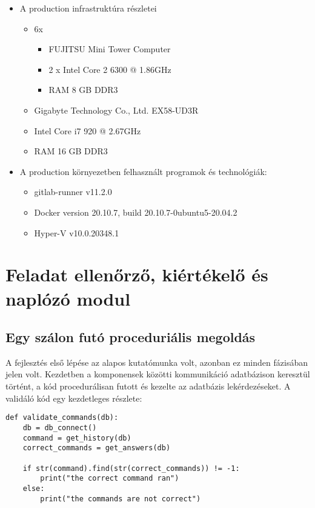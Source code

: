 \documentclass[12pt]{report}
\begin{document}
\begin{itemize}
    \item A production infrastruktúra részletei
    \begin{itemize}
        \item 6x
        \begin{itemize}
            \item FUJITSU Mini Tower Computer
            \item 2 x Intel Core 2 6300 @ 1.86GHz
            \item RAM 8 GB DDR3
        \end{itemize}
        \item Gigabyte Technology Co., Ltd. EX58-UD3R
        \item Intel Core i7 920 @ 2.67GHz
        \item RAM 16 GB DDR3
    \end{itemize}
    \item A production környezetben felhasznált programok és technológiák:
    \begin{itemize}
        \item gitlab-runner v11.2.0
        \item Docker version 20.10.7, build 20.10.7-0ubuntu5-20.04.2
        \item Hyper-V v10.0.20348.1
    \end{itemize}
\end{itemize}


\chapter{Feladat ellenőrző, kiértékelő és naplózó modul}
\section{Egy szálon futó proceduriális megoldás}


A fejlesztés első lépése az alapos kutatómunka volt, azonban ez minden fázisában jelen volt. Kezdetben a komponensek közötti kommunikáció adatbázison keresztül történt, a kód procedurálisan futott és kezelte az adatbázis lekérdezéseket. A validáló kód egy kezdetleges részlete:

\begin{verbatim}
def validate_commands(db):
    db = db_connect()
    command = get_history(db)
    correct_commands = get_answers(db)

    if str(command).find(str(correct_commands)) != -1:
        print("the correct command ran")
    else:
        print("the commands are not correct")
\end{verbatim}
\end{document}
